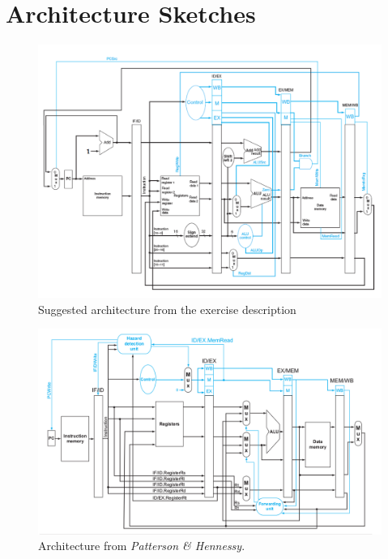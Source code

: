 \chapter{Architecture Sketches}
\label{app:architecture}

\begin{figure}[h]
    \centering
    \includegraphics[width=\textwidth]{img/suggested_architecture}
    \caption{
      Suggested architecture from the exercise description\cite[Section 5.2]{bib:compendium}
    }
    \label{fig:suggested_architecture}
\end{figure}

\begin{figure}[h]
    \centering
    \includegraphics[width=\textwidth]{img/book_architecture}
    \caption{
        Architecture from \textit{Patterson \& Hennessy}\cite[Chapter 4.7]{bib:patt-henn}.
    }
    \label{fig:book_architecture}
\end{figure}

